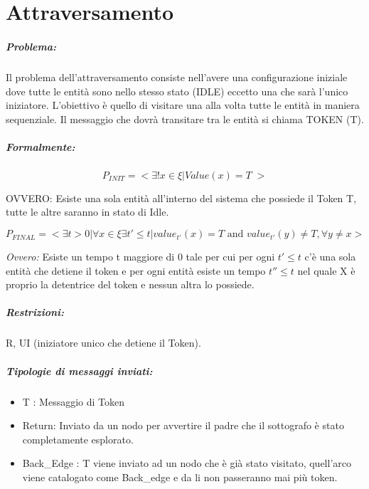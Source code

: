 \chapter{Attraversamento}

\paragraph{Problema:} Il problema dell'attraversamento consiste nell'avere una
configurazione iniziale dove tutte le entità sono nello stesso stato (IDLE)
eccetto una che sarà l'unico iniziatore. L'obiettivo è quello di visitare una
alla volta tutte le entità in maniera sequenziale. Il messaggio che dovrà
transitare tra le entità si chiama TOKEN (T).

\paragraph{Formalmente:}

$$
    P_{INIT} = <\exists ! x \in \xi | Value(x) = T \;>
$$

OVVERO: Esiste una sola entità all'interno del sistema che possiede il
Token T, tutte le altre saranno in stato di Idle.

$$
    P_{FINAL} = <\exists t>0 | \forall x \in \xi \exists t' \leq t | value_{t'}(x)
    = T \text{ and } value_{t'}(y) \neq T, \forall y \neq x >
$$

\textit{Ovvero:} Esiste un tempo t maggiore di 0 tale per cui per ogni $t' \leq
    t$ c'è una sola entità che detiene il token e per ogni entità esiste un tempo
$t'' \leq t$ nel quale X è proprio la detentrice del token e nessun altra lo
possiede.

\paragraph{Restrizioni:} R, UI (iniziatore unico che detiene il Token).

\paragraph{Tipologie di messaggi inviati:}
\begin{itemize}
    \item T : Messaggio di Token
    \item Return: Inviato da un nodo per avvertire il padre che il sottografo è
          stato completamente esplorato.
    \item Back\_Edge : T viene inviato ad un nodo che è già stato visitato,
          quell'arco viene catalogato come Back\_edge e da li non passeranno mai più
          token.
\end{itemize}

